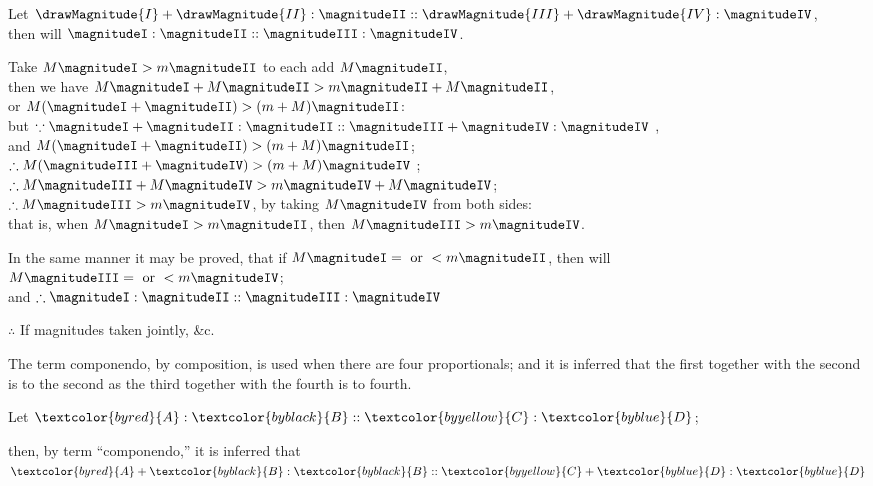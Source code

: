 \documentclass[booklanguage=english]{byrnebook}
\begin{document}
\begin{center}
Let $\drawMagnitude{I} + \drawMagnitude{II} : \magnitudeII :: \drawMagnitude{III} + \drawMagnitude{IV} : \magnitudeIV$,\\
then will $\magnitudeI : \magnitudeII :: \magnitudeIII : \magnitudeIV$.

Take $M \magnitudeI > m \magnitudeII$ to each add $M \magnitudeII$,\\
then we have $M \magnitudeI + M \magnitudeII > m \magnitudeII + M \magnitudeII$,\\
or $M (\magnitudeI + \magnitudeII) > (m + M) \magnitudeII$:\\
but $\because \magnitudeI + \magnitudeII: \magnitudeII :: \magnitudeIII + \magnitudeIV: \magnitudeIV$ \byref{\hypref},\\ %
and $M (\magnitudeI + \magnitudeII) > (m + M) \magnitudeII$;\\
$\therefore M(\magnitudeIII + \magnitudeIV) > (m + M) \magnitudeIV$ ;\\
$\therefore M \magnitudeIII + M \magnitudeIV > m \magnitudeIV + M \magnitudeIV$;\\
$\therefore M \magnitudeIII > m \magnitudeIV$, by taking $M \magnitudeIV$ from both sides:\\
that is, when $M \magnitudeI > m \magnitudeII$, then $M \magnitudeIII > m \magnitudeIV$.

In the same manner it may be proved, that if $M \magnitudeI = \mbox{ or } < m \magnitudeII$, then will $M \magnitudeIII = \mbox{ or } < m \magnitudeIV$;\\
and $\therefore \magnitudeI : \magnitudeII :: \magnitudeIII : \magnitudeIV$ 

$\therefore$ If magnitudes taken jointly, \&c.
\end{center}

\vfill\pagebreak

\label{def:V.XV} 
\def\varA{\textcolor{byred}{A}}
\def\varB{\textcolor{byblack}{B}}
\def\varC{\textcolor{byyellow}{C}}
\def\varD{\textcolor{byblue}{D}}
The term componendo, by composition, is used when there are four proportionals; and it is inferred that the first together with the second is to the second as the third together with the fourth is to fourth.

\begin{center}
Let $\varA : \varB :: \varC : \varD$;

then, by term \enquote{componendo,} it is inferred that\\
$\varA + \varB : \varB :: \varC + \varD: \varD$
\end{center}
\end{document}
